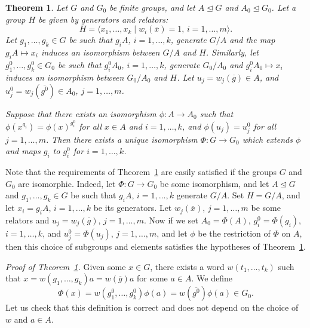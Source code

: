 \documentclass{article}
\newtheorem{theorem}{Theorem}[section]
\begin{document}
\begin{theorem}\label{kgenext}
	Let \( G \) and \( G_0 \) be finite groups, and let \( A \unlhd G \) and \( A_0 \unlhd G_0 \).
	Let a group \( H \) be given by generators and relators:
	\[ H = \langle x_1, \dots, x_k \mid w_i(\overline{x}) = 1,\, i = 1, \dots, m \rangle. \]
	Let \( g_1, \dots, g_k \in G \) be such that \( g_iA \), \( i = 1, \dots, k \), generate \( G/A \) and the map \( g_iA \mapsto x_i \)
	induces an isomorphism between \( G/A \) and \( H \). Similarly, let \( g^0_1, \dots, g^0_k \in G_0 \) be such that \( g^0_iA_0 \), \( i = 1, \dots, k \),
	generate \( G_0/A_0 \) and \( g^0_iA_0 \mapsto x_i \) induces an isomorphism between \( G_0/A_0 \) and \( H \).
	Let \( u_j = w_j(\overline{g}) \in A \), and \( u^0_j = w_j(\overline{g^0}) \in A_0 \), \( j = 1, \dots, m \).

	Suppose that there exists an isomorphism \( \phi : A \to A_0 \) such that \( \phi(x^{g_i}) = \phi(x)^{g^0_i} \) for all \( x \in A \) and \( i = 1, \dots, k \),
	and \( \phi(u_j) = u_j^0 \) for all \( j = 1, \dots, m \). Then there exists a unique isomorphism \( \Phi : G \to G_0 \) which extends \( \phi \)
	and maps \( g_i \) to \( g^0_i \) for \( i = 1, \dots, k \).
\end{theorem}

Note that the requirements of Theorem~\ref{kgenext} are easily satisfied if the groups \( G \) and \( G_0 \) are isomorphic.
Indeed, let \( \Phi : G \to G_0 \) be some isomorphism, and let \( A \unlhd G \) and \( g_1, \dots, g_k \in G \) be such that
\( g_iA \), \( i = 1, \dots, k \) generate \( G/A \). Set \( H = G/A \), and let \( x_i = g_iA \), \( i = 1, \dots, k \) be its generators.
Let \( w_j(\overline{x}) \), \( j = 1, \dots, m \) be some relators and \( u_j = w_j(\overline{g}) \), \( j = 1, \dots, m \).
Now if we set \( A_0 = \Phi(A) \), \( g^0_i = \Phi(g_i) \), \( i = 1, \dots, k \), and \( u^0_j = \Phi(u_j) \), \( j = 1, \dots, m \),
and let \( \phi \) be the restriction of \( \Phi \) on \( A \), then this choice of subgroups and elements satisfies the hypotheses of Theorem~\ref{kgenext}.
\medskip

\noindent
\emph{Proof of Theorem~\ref{kgenext}.}
Given some \( x \in G \), there exists a word \( w(t_1, \dots, t_k) \) such that \( x = w(g_1, \dots, g_k)a = w(\overline{g})a \) for some \( a \in A \).
We define
\[ \Phi(x) = w(g^0_1, \dots, g^0_k)\phi(a) = w(\overline{g^0})\phi(a) \in G_0. \]
Let us check that this definition is correct and does not depend on the choice of \( w \) and \( a \in A \).
\end{document}
